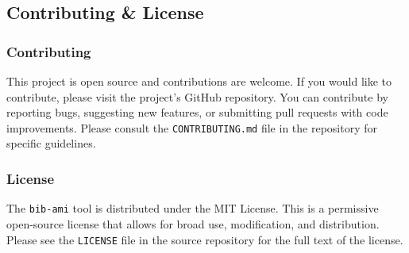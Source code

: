 \documentclass[11pt, a4paper]{article}
\begin{document}
\subsection{Contributing \& License}

\subsubsection{Contributing}
This project is open source and contributions are welcome. If you would like to contribute, please visit the project's GitHub repository. You can contribute by reporting bugs, suggesting new features, or submitting pull requests with code improvements. Please consult the \texttt{CONTRIBUTING.md} file in the repository for specific guidelines.

\subsubsection{License}
The \texttt{bib-ami} tool is distributed under the MIT License. This is a permissive open-source license that allows for broad use, modification, and distribution. Please see the \texttt{LICENSE} file in the source repository for the full text of the license.
\end{document}
